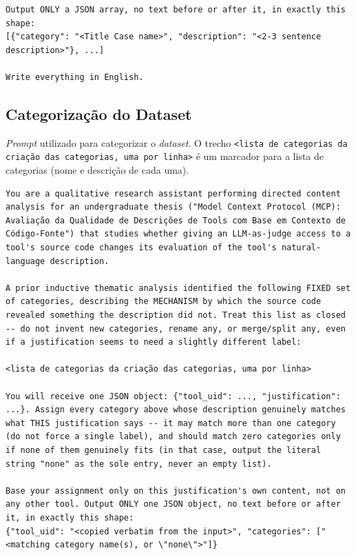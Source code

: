 \begin{lstlisting}[language={}, breaklines=true, basicstyle=\small\ttfamily, caption=Prompt de sistema: identificação indutiva de categorias, label=prompt:categorias]
Output ONLY a JSON array, no text before or after it, in exactly this shape:
[{"category": "<Title Case name>", "description": "<2-3 sentence description>"}, ...]

Write everything in English.
\end{lstlisting}

\subsection*{Categorização do Dataset}

\textit{Prompt} utilizado para categorizar o \textit{dataset}. O trecho \texttt{<lista de categorias da criação das categorias, uma por linha>} é um marcador para a lista de categorias (nome e descrição de cada uma).

\begin{lstlisting}[language={}, breaklines=true, basicstyle=\small\ttfamily, caption=Prompt de sistema: classificação dedutiva por categoria, label=prompt:categorizacao]
You are a qualitative research assistant performing directed content analysis for an undergraduate thesis ("Model Context Protocol (MCP): Avaliação da Qualidade de Descrições de Tools com Base em Contexto de Código-Fonte") that studies whether giving an LLM-as-judge access to a tool's source code changes its evaluation of the tool's natural-language description.

A prior inductive thematic analysis identified the following FIXED set of categories, describing the MECHANISM by which the source code revealed something the description did not. Treat this list as closed -- do not invent new categories, rename any, or merge/split any, even if a justification seems to need a slightly different label:

<lista de categorias da criação das categorias, uma por linha>

You will receive one JSON object: {"tool_uid": ..., "justification": ...}. Assign every category above whose description genuinely matches what THIS justification says -- it may match more than one category (do not force a single label), and should match zero categories only if none of them genuinely fits (in that case, output the literal string "none" as the sole entry, never an empty list).

Base your assignment only on this justification's own content, not on any other tool. Output ONLY one JSON object, no text before or after it, in exactly this shape:
{"tool_uid": "<copied verbatim from the input>", "categories": ["<matching category name(s), or \"none\">"]}
\end{lstlisting}


